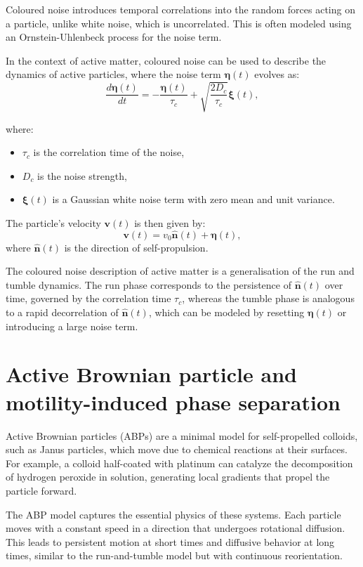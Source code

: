 \documentclass[
  letterpaper,
  enabledeprecatedfontcommands]{report}
\providecommand{\tightlist}{%
  \setlength{\itemsep}{0pt}\setlength{\parskip}{0pt}}
\begin{document}
Coloured noise introduces temporal correlations into the random forces
acting on a particle, unlike white noise, which is uncorrelated. This is
often modeled using an Ornstein-Uhlenbeck process for the noise term.

In the context of active matter, coloured noise can be used to describe
the dynamics of active particles, where the noise term
\(\boldsymbol{\eta}(t)\) evolves as: \[
\frac{d\boldsymbol{\eta}(t)}{dt} = -\frac{\boldsymbol{\eta}(t)}{\tau_c} + \sqrt{\frac{2D_c}{\tau_c}} \boldsymbol{\xi}(t),
\]

where:

\begin{itemize}
\tightlist
\item
  \(\tau_c\) is the correlation time of the noise,
\item
  \(D_c\) is the noise strength,
\item
  \(\boldsymbol{\xi}(t)\) is a Gaussian white noise term with zero mean
  and unit variance.
\end{itemize}

The particle's velocity \(\mathbf{v}(t)\) is then given by: \[
\mathbf{v}(t) = v_0 \hat{\mathbf{n}}(t) + \boldsymbol{\eta}(t),
\] where \(\hat{\mathbf{n}}(t)\) is the direction of self-propulsion.

The coloured noise description of active matter is a generalisation of
the run and tumble dynamics. The run phase corresponds to the
persistence of \(\hat{\mathbf{n}}(t)\) over time, governed by the
correlation time \(\tau_c\), whereas the tumble phase is analogous to a
rapid decorrelation of \(\hat{\mathbf{n}}(t)\), which can be modeled by
resetting \(\boldsymbol{\eta}(t)\) or introducing a large noise term.

\section{Active Brownian particle and motility-induced phase
separation}\label{active-brownian-particle-and-motility-induced-phase-separation}

Active Brownian particles (ABPs) are a minimal model for self-propelled
colloids, such as Janus particles, which move due to chemical reactions
at their surfaces. For example, a colloid half-coated with platinum can
catalyze the decomposition of hydrogen peroxide in solution, generating
local gradients that propel the particle forward.

The ABP model captures the essential physics of these systems. Each
particle moves with a constant speed in a direction that undergoes
rotational diffusion. This leads to persistent motion at short times and
diffusive behavior at long times, similar to the run-and-tumble model
but with continuous reorientation.
\end{document}
